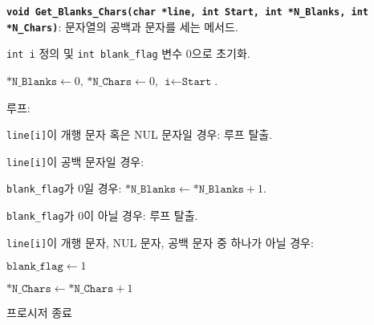 \textbf{\texttt{void Get_Blanks_Chars(char *line, int Start, int *N_Blanks, int *N_Chars)}}: 문자열의 공백과 문자를 세는 메서드.
\begin{algorithm}
	\item \texttt{int i} 정의 및 \texttt{int blank_flag} 변수 0으로 초기화.
	\item $\texttt{*N_Blanks} \leftarrow 0$, $\texttt{*N_Chars} \leftarrow 0$, $\texttt{i} \leftarrow \texttt{Start}$.
	\item 루프:
			\begin{algorithm}
				\item \texttt{line[i]}이 개행 문자 혹은 NUL 문자일 경우: 루프 탈출.
				\item \texttt{line[i]}이 공백 문자일 경우:
					\begin{algorithm}
						\item \texttt{blank_flag}가 0일 경우: $\texttt{*N_Blanks} \leftarrow \texttt{*N_Blanks} + 1$.
						\item \texttt{blank_flag}가 0이 아닐 경우: 루프 탈출.
 					\end{algorithm}
				\item \texttt{line[i]}이 개행 문자, NUL 문자, 공백 문자 중 하나가 아닐 경우:
					\begin{algorithm}
						\item $\texttt{blank_flag} \leftarrow 1$
						\item $\texttt{*N_Chars} \leftarrow \texttt{*N_Chars} + 1$
 					\end{algorithm}
			\end{algorithm} 
	\item 프로시저 종료
\end{algorithm}

